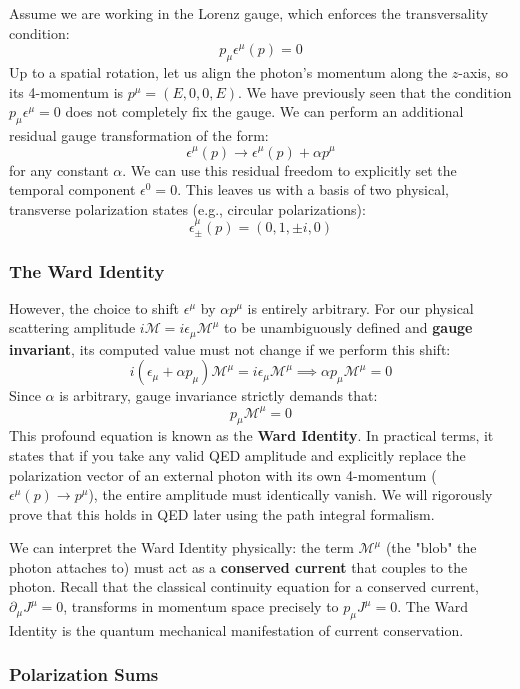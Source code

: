 Assume we are working in the Lorenz gauge, which enforces the transversality condition:
\[
    p_\mu \epsilon^\mu(p) = 0
\]
Up to a spatial rotation, let us align the photon's momentum along the $z$-axis, so its 4-momentum is $p^\mu = (E, 0, 0, E)$. We have previously seen that the condition $p_\mu \epsilon^\mu = 0$ does not completely fix the gauge. We can perform an additional residual gauge transformation of the form:
\[
    \epsilon^\mu(p) \to \epsilon^\mu(p) + \alpha p^\mu
\]
for any constant $\alpha$. We can use this residual freedom to explicitly set the temporal component $\epsilon^0 = 0$. This leaves us with a basis of two physical, transverse polarization states (e.g., circular polarizations):
\[
    \epsilon^\mu_{\pm}(p) = (0, 1, \pm i, 0)
\]

\subsubsection{The Ward Identity}
However, the choice to shift $\epsilon^\mu$ by $\alpha p^\mu$ is entirely arbitrary. For our physical scattering amplitude $i\mathcal{M} = i \epsilon_\mu \mathcal{M}^\mu$ to be unambiguously defined and \textbf{gauge invariant}, its computed value must not change if we perform this shift:
\[
    i (\epsilon_\mu + \alpha p_\mu) \mathcal{M}^\mu = i \epsilon_\mu \mathcal{M}^\mu \implies \alpha p_\mu \mathcal{M}^\mu = 0
\]
Since $\alpha$ is arbitrary, gauge invariance strictly demands that:
\[
    p_\mu \mathcal{M}^\mu = 0
\]
This profound equation is known as the \textbf{Ward Identity}.
In practical terms, it states that if you take any valid QED amplitude and explicitly replace the polarization vector of an external photon with its own 4-momentum ($\epsilon^\mu(p) \to p^\mu$), the entire amplitude must identically vanish. We will rigorously prove that this holds in QED later using the path integral formalism.

\begin{remark}
    We can interpret the Ward Identity physically: the term $\mathcal{M}^\mu$ (the "blob" the photon attaches to) must act as a \textbf{conserved current} that couples to the photon. Recall that the classical continuity equation for a conserved current, $\partial_\mu J^\mu = 0$, transforms in momentum space precisely to $p_\mu J^\mu = 0$. The Ward Identity is the quantum mechanical manifestation of current conservation.
\end{remark}

\subsubsection{Polarization Sums}

